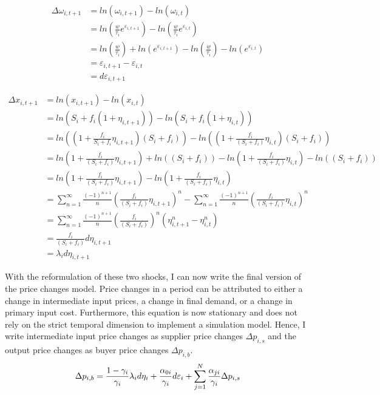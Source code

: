 \begin{equation} \label{eq:cost_change}
    \begin{split}
        \Delta \omega_{i,t+1} &= ln(\omega_{i,t+1}) - ln(\omega_{i,t}) \\
        &= ln(\frac{w}{\tau_i} e^{\varepsilon_{i,t+1}}) - ln(\frac{w}{\tau_i} e^{\varepsilon_{i,t}}) \\
        &= ln(\frac{w}{\tau_i}) + ln(e^{\varepsilon_{i,t+1}}) - ln(\frac{w}{\tau_i}) - ln(e^{\varepsilon_{i,t}}) \\
        &= \varepsilon_{i,t+1} - \varepsilon_{i,t} \\
        &= d \varepsilon_{i,t+1}
    \end{split}
\end{equation}

\begin{equation} \label{eq:demand_change}
    \begin{split}
        \Delta x_{i,t+1} &= ln(x_{i,t+1}) - ln(x_{i,t}) \\
        &= ln(S_i + f_i(1+\eta_{i,t+1})) - ln(S_i + f_i(1+\eta_{i,t}))\\
        &= ln\left((1 + \frac{f_i}{S_i + f_i}\eta_{i,t+1}) (S_i+f_i) \right) - ln\left((1 + \frac{f_i}{(S_i+f_i)} \eta_{i,t}) (S_i+f_i) \right) \\
        &= ln(1 + \frac{f_i}{(S_i+f_i)} \eta_{i,t+1}) + ln((S_i+f_i)) - ln(1 + \frac{f_i}{(S_i+f_i)} \eta_{i,t}) - ln((S_i+f_i)) \\
        &= ln(1 + \frac{f_i}{(S_i+f_i)} \eta_{i,t+1}) - ln(1 + \frac{f_i}{(S_i+f_i)} \eta_{i,t}) \\
        &= \sum_{n=1}^{\infty} \frac{(-1)^{n+1}}{n} \left(\frac{f_i}{(S_i+f_i)} \eta_{i,t+1}\right)^n - \sum_{n=1}^{\infty} \frac{(-1)^{n+1}}{n} \left(\frac{f_i}{(S_i+f_i)} \eta_{i,t}\right)^n \\
        &= \sum_{n=1}^{\infty} \frac{(-1)^{n+1}}{n} \left(\frac{f_i}{(S_i+f_i)}\right)^n (\eta_{i,t+1}^n - \eta_{i,t}^n) \\
        &= \frac{f_i}{(S_i+f_i)} d \eta_{i,t+1} \\
        &= \lambda_i d \eta_{i,t+1}
    \end{split}
\end{equation}

With the reformulation of these two shocks, I can now write the final version of the price changes model. Price changes in a period can 
be attributed to either a change in intermediate input prices, a change in final demand, or a change in primary input cost. 
Furthermore, this equation is now stationary and does not rely on the strict temporal dimension to implement a simulation model. 
Hence, I write intermediate input price changes as supplier price changes $\Delta p_{i,s}$ and the output price changes as buyer price 
changes $\Delta p_{i,b}$.
\begin{equation} \label{eq:price_changes}
    \Delta p_{i,b} = \frac{1-\gamma_i}{\gamma_i}  \lambda_i d \eta_{i} + \frac{\alpha_{0i}}{\gamma_i} d \varepsilon_{i} + \sum_{j=1}^N \frac{\alpha_{ji}}{\gamma_i} \Delta p_{i,s} \\
\end{equation}

